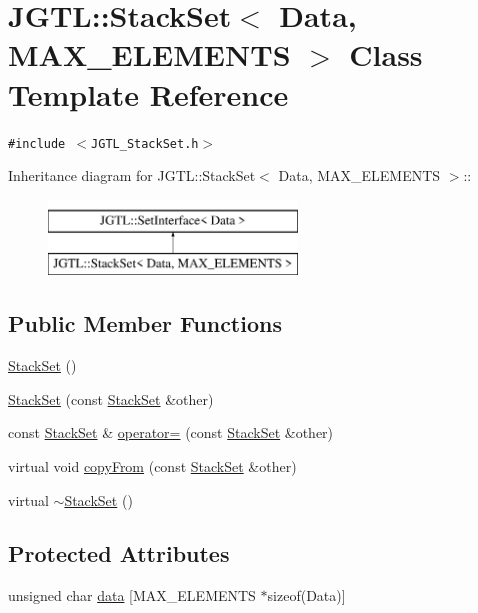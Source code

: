 \hypertarget{class_j_g_t_l_1_1_stack_set}{
\section{JGTL::Stack\-Set$<$ Data, MAX\_\-ELEMENTS $>$ Class Template Reference}
\label{class_j_g_t_l_1_1_stack_set}
}
{\tt \#include $<$JGTL\_\-Stack\-Set.h$>$}

Inheritance diagram for JGTL::Stack\-Set$<$ Data, MAX\_\-ELEMENTS $>$::\begin{figure}[H]
\begin{center}
\leavevmode
\includegraphics[height=2cm]{class_j_g_t_l_1_1_stack_set}
\end{center}
\end{figure}
\subsection*{Public Member Functions}
\begin{CompactItemize}
\item 
\hyperlink{class_j_g_t_l_1_1_stack_set_842b6b0d43ade3636a6f5eb7cc29cfc5}{Stack\-Set} ()
\item 
\hyperlink{class_j_g_t_l_1_1_stack_set_b2cc18e5b25781be9e000c3d206bfcbd}{Stack\-Set} (const \hyperlink{class_j_g_t_l_1_1_stack_set}{Stack\-Set} \&other)
\item 
const \hyperlink{class_j_g_t_l_1_1_stack_set}{Stack\-Set} \& \hyperlink{class_j_g_t_l_1_1_stack_set_6afeb5e3f6d4433b9938f3743f02aa1c}{operator=} (const \hyperlink{class_j_g_t_l_1_1_stack_set}{Stack\-Set} \&other)
\item 
virtual void \hyperlink{class_j_g_t_l_1_1_stack_set_0f724177e6688d06eb8c4923e225e82f}{copy\-From} (const \hyperlink{class_j_g_t_l_1_1_stack_set}{Stack\-Set} \&other)
\item 
virtual \hyperlink{class_j_g_t_l_1_1_stack_set_6494c9bbda6ab35af078faafaac7f02c}{$\sim$Stack\-Set} ()
\end{CompactItemize}
\subsection*{Protected Attributes}
\begin{CompactItemize}
\item 
unsigned char \hyperlink{class_j_g_t_l_1_1_stack_set_1c9f174be3aa9681935d4b7a300dbd79}{data} \mbox{[}MAX\_\-ELEMENTS $\ast$sizeof(Data)\mbox{]}
\end{CompactItemize}

